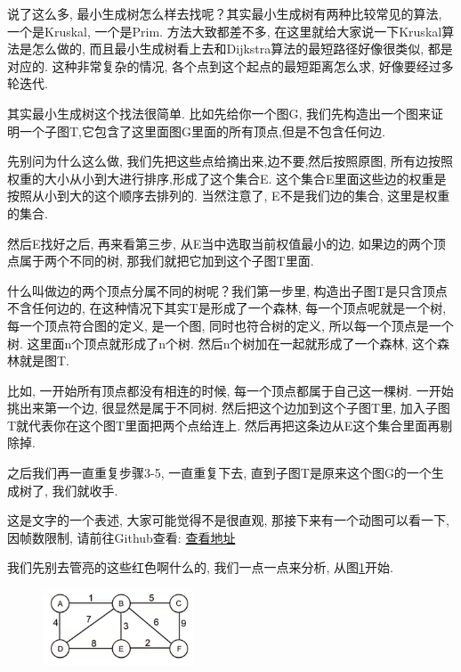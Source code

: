 说了这么多, 最小生成树怎么样去找呢？其实最小生成树有两种比较常见的算法, 一个是Kruskal, 一个是Prim. 方法大致都差不多, 在这里就给大家说一下Kruskal算法是怎么做的, 而且最小生成树看上去和Dijkstra算法的最短路径好像很类似, 都是对应的. 这种非常复杂的情况, 各个点到这个起点的最短距离怎么求, 好像要经过多轮迭代. 

其实最小生成树这个找法很简单. 比如先给你一个图G, 我们先构造出一个图来证明一个子图T,它包含了这里面图G里面的所有顶点,但是不包含任何边.

先别问为什么这么做, 我们先把这些点给摘出来,边不要,然后按照原图, 所有边按照权重的大小从小到大进行排序,形成了这个集合E. 这个集合E里面这些边的权重是按照从小到大的这个顺序去排列的. 当然注意了, E不是我们边的集合, 这里是权重的集合. 

然后E找好之后, 再来看第三步, 从E当中选取当前权值最小的边, 如果边的两个顶点属于两个不同的树, 那我们就把它加到这个子图T里面. 

什么叫做边的两个顶点分属不同的树呢？我们第一步里, 构造出子图T是只含顶点不含任何边的, 在这种情况下其实T是形成了一个森林, 每一个顶点呢就是一个树, 每一个顶点符合图的定义, 是一个图, 同时也符合树的定义, 所以每一个顶点是一个树. 这里面n个顶点就形成了n个树. 然后n个树加在一起就形成了一个森林, 这个森林就是图T. 

比如, 一开始所有顶点都没有相连的时候, 每一个顶点都属于自己这一棵树. 一开始挑出来第一个边, 很显然是属于不同树. 然后把这个边加到这个子图T里, 加入子图T就代表你在这个图T里面把两个点给连上. 然后再把这条边从E这个集合里面再剔除掉. 

之后我们再一直重复步骤3-5, 一直重复下去, 直到子图T是原来这个图G的一个生成树了, 我们就收手. 

这是文字的一个表述, 大家可能觉得不是很直观, 那接下来有一个动图可以看一下, 因帧数限制, 请前往Github查看: \href{https://github.com/hivandu/AI_Cheats/blob/main/math/Minimal%20spanning%20tree.gif}{查看地址}

我们先别去管亮的这些红色啊什么的, 我们一点一点来分析, 从图\ref{fig:img27_6}开始. 

\begin{figure}[ht]
  \centering
  \includegraphics[width=0.4\textwidth]{asset/07406ba2-1bde-448c-a84b-eaf3716aaeb0.jpg}
  \caption{}
  \label{fig:img27_6}
\end{figure}

